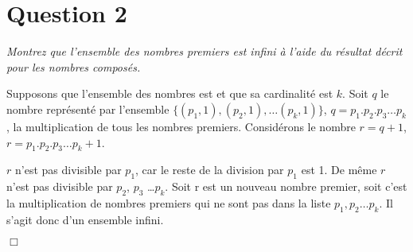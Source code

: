 \section*{Question 2}
\emph{Montrez que l’ensemble des nombres premiers est infini à l’aide du résultat décrit pour les nombres composés.}

\bigskip
Supposons que l’ensemble des nombres est et que sa cardinalité est $k$. Soit $q$ le nombre représenté par l’ensemble \( \{(p_1, 1), (p_2, 1), \dots (p_k, 1)\}\), \( q = p_1 . p_2 . p_3 \dots p_k\), la multiplication de tous les nombres premiers. Considérons le nombre \(r = q + 1\), \( r = p_1 . p_2 . p_3 \dots p_k + 1\).

\medskip

$r$ n’est pas divisible par $p_1$, car le reste de la division par $p_1$ est 1. De même $r$ n’est pas divisible par $p_2$, $p_3$ \dots $p_k$. Soit r est un \og nouveau \fg{} nombre premier, soit c’est la multiplication de nombres premiers qui ne sont pas dans la liste $p_1, p_2 \dots p_k$. Il s’agit donc d’un ensemble infini.

\begin{flushright}
	$\Box$
\end{flushright} 